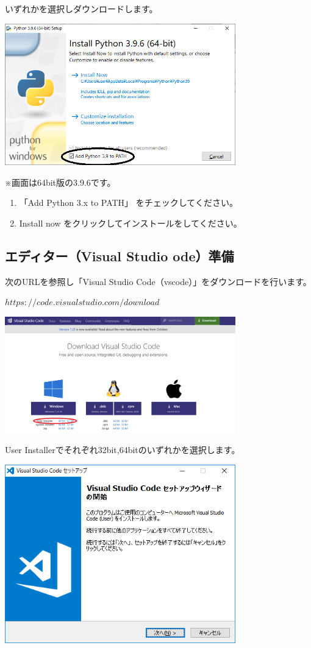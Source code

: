 \documentclass[11pt,a4paper,dvipdfmx,titlepage]{jsreport}
\begin{document}
いずれかを選択しダウンロードします。

\includegraphics[width=10cm]{images/image8.png}

※画面は64bit版の3.9.6です。
\begin{enumerate}	
	\item 「Add Python 3.x to PATH」 をチェックしてください。
	\item Install now をクリックしてインストールをしてください。
\end{enumerate}

\subsection{エディター（Visual Studio ode）準備}

次のURLを参照し「Visual Studio Code（vscode）」をダウンロードを行います。

\begin{description}
	\item $https://code.visualstudio.com/download$
\end{description}

\includegraphics[width=10cm]{images/image9.png}

User Installerでそれぞれ32bit,64bitのいずれかを選択します。

\includegraphics[width=10cm]{images/image12.png}
\end{document}
